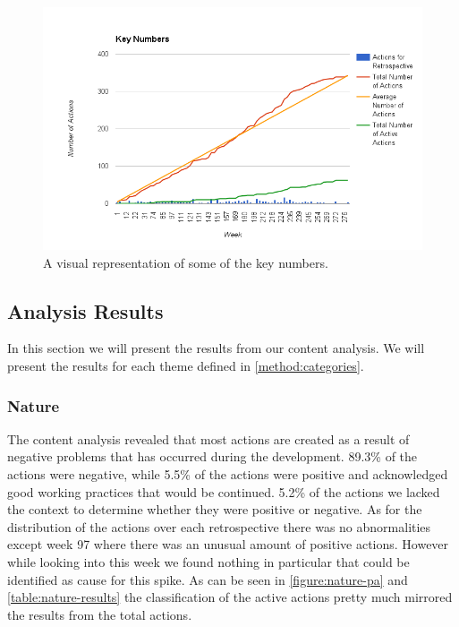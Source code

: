 \begin{figure}[!h]
	\centering
	\includegraphics[width=\textwidth, keepaspectratio]{figures/key-numbers.png}
	\caption{A visual representation of some of the key numbers.}
	\label{figure:key-numbers}
\end{figure}
\clearpage	

\subsection{Analysis Results}
In this section we will present the results from our content analysis. We will present the results for each theme defined in \autoref{method:categories}. 

\subsubsection{Nature}
The content analysis revealed that most actions are created as a result of negative problems that has occurred during the development. 89.3\% of the actions were negative, while 5.5\% of the actions were positive and acknowledged good working practices that would be continued. 5.2\% of the actions we lacked the context to determine whether they were positive or negative. As for the distribution of the actions over each retrospective there was no abnormalities except week 97 where there was an unusual amount of positive actions. However while looking into this week we found nothing in particular that could be identified as cause for this spike. As can be seen in \autoref{figure:nature-pa} and \autoref{table:nature-results} the classification of the active actions pretty much mirrored the results from the total actions. 

